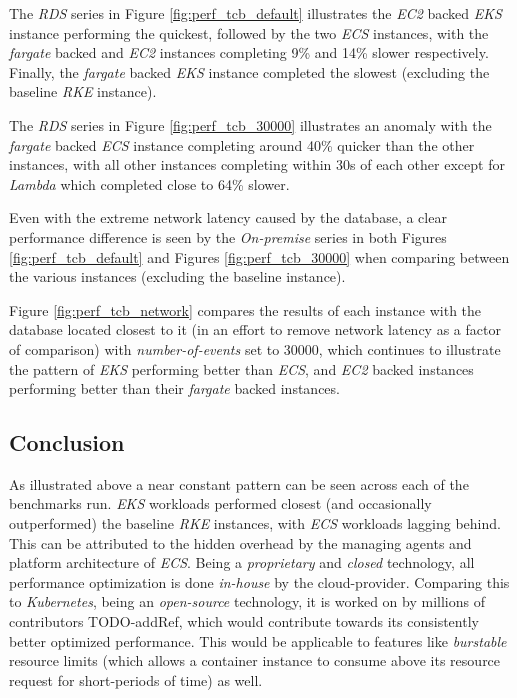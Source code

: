 The \textit{RDS} series in Figure \ref{fig:perf_tcb_default} illustrates the \textit{EC2} backed \textit{EKS} instance performing the quickest,
followed by the two \textit{ECS} instances, with the \textit{fargate} backed and \textit{EC2} instances completing 9\% and 14\% slower respectively.
Finally, the \textit{fargate} backed \textit{EKS} instance completed the slowest (excluding the baseline \textit{RKE} instance).

The \textit{RDS} series in Figure \ref{fig:perf_tcb_30000} illustrates an anomaly with the \textit{fargate} backed \textit{ECS}
instance completing around 40\% quicker than the other instances, with all other instances completing within 30s of each other
except for \textit{Lambda} which completed close to 64\% slower.

Even with the extreme network latency caused by the database, a clear performance difference is seen by the \textit{On-premise} series in both Figures \ref{fig:perf_tcb_default} and Figures \ref{fig:perf_tcb_30000}
when comparing between the various instances (excluding the baseline instance).

Figure \ref{fig:perf_tcb_network} compares the results of each instance with the database located closest to it (in an effort to remove network latency as a factor of comparison) with \textit{number-of-events} set to 30000,
which continues to illustrate the pattern of \textit{EKS} performing better than \textit{ECS},
and \textit{EC2} backed instances performing better than their \textit{fargate} backed instances.


\subsection*{Conclusion}
As illustrated above a near constant pattern can be seen across each of the benchmarks run. \textit{EKS} workloads performed closest (and occasionally outperformed) the baseline \textit{RKE} instances,
with \textit{ECS} workloads lagging behind. This can be attributed to the hidden overhead by the managing agents and platform architecture of \textit{ECS}.
Being a \emph{proprietary} and \emph{closed} technology, all performance optimization is done \emph{in-house} by the cloud-provider.
Comparing this to \textit{Kubernetes}, being an \textit{open-source} technology, it is worked on by millions of contributors TODO-addRef, which would contribute towards its consistently better optimized
performance. This would be applicable to features like \emph{burstable} resource limits (which allows a container instance to consume above its resource request for short-periods of time) as well.

